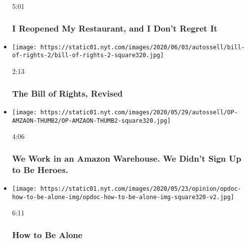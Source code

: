 \begin{itemize}
  5:01

  \hypertarget{i-reopened-my-restaurant-and-i-dont-regret-it}{%
  \subsubsection{I Reopened My Restaurant, and I Don't Regret
  It}\label{i-reopened-my-restaurant-and-i-dont-regret-it}}
\item
  \href{https://www.nytimes.com/video/opinion/100000007171122/protests-constitutional-rights.html?action=click\&module=video-series-bar\&region=header\&pgtype=Article\&playlistId=video/opinion}{}

  \texttt{[image: https://static01.nyt.com/images/2020/06/03/autossell/bill-of-rights-2/bill-of-rights-2-square320.jpg]}

  2:13

  \hypertarget{the-bill-of-rights-revised}{%
  \subsubsection{The Bill of Rights,
  Revised}\label{the-bill-of-rights-revised}}
\item
  \href{https://www.nytimes.com/video/opinion/100000007161402/coronavirus-amazon-hazard-pay.html?action=click\&module=video-series-bar\&region=header\&pgtype=Article\&playlistId=video/opinion}{}

  \texttt{[image: https://static01.nyt.com/images/2020/05/29/autossell/OP-AMZAON-THUMB2/OP-AMZAON-THUMB2-square320.jpg]}

  4:06

  \hypertarget{we-work-in-an-amazon-warehouse-we-didnt-sign-up-to-be-heroes}{%
  \subsubsection{We Work in an Amazon Warehouse. We Didn't Sign Up to Be
  Heroes.}\label{we-work-in-an-amazon-warehouse-we-didnt-sign-up-to-be-heroes}}
\item
  \href{https://www.nytimes.com/video/opinion/100000007139379/how-to-be-alone.html?action=click\&module=video-series-bar\&region=header\&pgtype=Article\&playlistId=video/opinion}{}

  \texttt{[image: https://static01.nyt.com/images/2020/05/23/opinion/opdoc-how-to-be-alone-img/opdoc-how-to-be-alone-img-square320-v2.jpg]}

  6:11

  \hypertarget{how-to-be-alone}{%
  \subsubsection{How to Be Alone}\label{how-to-be-alone}}
\end{itemize}

